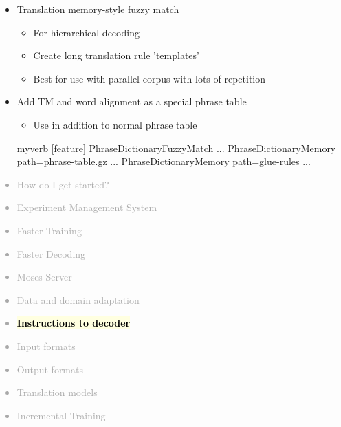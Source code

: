 \documentclass[landscape]{uedslides2C}
\newcommand{\currenttopic}[1]{\colorbox{lightyellow}{\textcolor{black}{\bf #1}}}
\begin{document}

\begin{itemize} \itemsep -1mm
\item Translation memory-style fuzzy match
  \begin{itemize}
  \item For hierarchical decoding
  \item Create long translation rule 'templates'
  \item Best for use with parallel corpus with lots of repetition
  \end{itemize}

\item Add TM and word alignment as a special phrase table
  \begin{itemize}
    \item Use in addition to normal phrase table
  \end{itemize}
  \begin{SaveVerbatim}{myverb} 
   [feature]
   PhraseDictionaryFuzzyMatch ...
   PhraseDictionaryMemory path=phrase-table.gz ...
   PhraseDictionaryMemory path=glue-rules ...
  \end{SaveVerbatim}
  \colorbox{gray}{}

\end{itemize}



\vspace{-5mm}
\textcolor{darkgrey}{
\small
\begin{itemize} \itemsep -1mm
\item {How do I get started?}
\item {Experiment Management System}
\item {Faster Training}
\item {Faster Decoding}
\item {Moses Server}
\item {Data and domain adaptation}
\item \currenttopic{Instructions to decoder}
\item {Input formats}
\item {Output formats}
\item {Translation models}
\item {Incremental Training}
\end{itemize}
}
\end{document}
